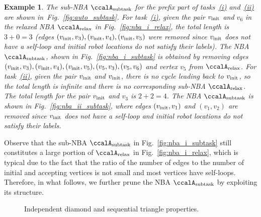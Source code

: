 \documentclass[Afour,sageh,times]{sagej}
\newtheorem{exmp}{Example}
\newcommand{\auto}[1]{\ccalA_{\textup{#1}}}
\newcommand{\vertex}[1]{v_{\textup{#1}}}
\newenvironment{cexmp}
{\addtocounter{exmp}{-1}\begin{exmp}}
  {\end{exmp}}
\begin{document}
     \begin{cexmp}
       The sub-NBA $\auto{subtask}$ for the prefix part of tasks~\hyperref[task:i]{\it (i)} and~\hyperref[task:i]{\it (ii)} are shown in~Fig.~\ref{fig:auto_subtask}. For task~\hyperref[task:i]{\it (i)}, given the pair $\vertex{init}$ and $v_6$ in the relaxed NBA $\auto{relax}$ in Fig.~\ref{fig:nba_i_relax}, the total length is $3+0=3$ (edges $(\vertex{init}, v_3), (\vertex{init}, v_4), (\vertex{init}, v_5)$ were removed since $\vertex{init}$ does not have a self-loop and initial robot locations do not satisfy their labels). The NBA $\auto{subtask}$, shown in  Fig.~\ref{fig:nba_i_subtask} is obtained by removing edges $(\vertex{init}, v_3), (\vertex{init}, v_4), (\vertex{init}, v_5), (v_5, v_3),  (v_5, v_6)$ and vertex $v_5$ from $\auto{relax}$. For task~\hyperref[task:i]{\it (ii)}, given the pair $\vertex{init}$ and $\vertex{init}$,  there is no cycle leading back to $\vertex{init}$, so the total length is infinite and there is no corresponding sub-NBA $\auto{relax}$. The total length for the pair $\vertex{init}$ and $v_3$ is $2+2=4$. The NBA $\auto{subtask}$ is shown in  Fig.~\ref{fig:nba_ii_subtask}, where edges $(\vertex{init}, v_1)$ and $(v_1, v_2)$ are removed since $\vertex{init}$ does not have a self-loop and initial robot locations do not satisfy their labels.
     \end{cexmp}

Observe that the sub-NBA $\auto{subtask}$ in Fig.~\ref{fig:nba_i_subtask} still constitutes a large portion of  $\auto{relax}$ in Fig.~\ref{fig:nba_i_relax}, which is typical due to the fact that the ratio of the number of edges to the number of initial and accepting vertices is not small and most vertices have self-loops. Therefore, in what follows, we further prune the NBA $\auto{subtask}$  by exploiting its structure.

\begin{figure}
  \centering
  \hspace{1em}
  \caption{Independent diamond and sequential triangle properties.}\label{fig:property}
\end{figure}
\end{document}
